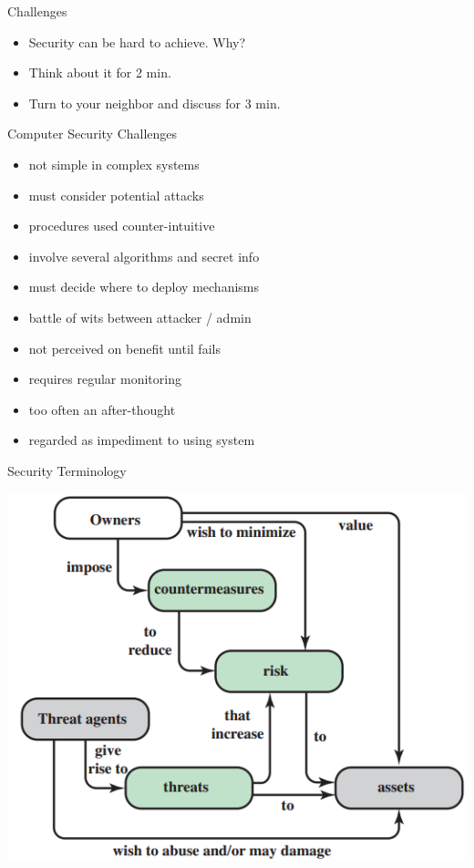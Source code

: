 \documentclass{beamer}
\begin{document}
\begin{frame}{Challenges}
  \begin{itemize}
  \item Security can be hard to achieve. Why? 
  \item Think about it for 2 min. 
  \item Turn to your neighbor and discuss for 3 min.
  \end{itemize}
\end{frame}
 
\begin{frame}{Computer Security Challenges}
  \begin{itemize}
\item not simple in complex systems 
\item must consider potential attacks 
\item procedures used counter-intuitive 
\item involve several algorithms and secret info 
\item must decide where to deploy mechanisms 
\item battle of wits between attacker / admin 
\item not perceived on benefit until fails 
\item requires regular monitoring 
\item too often an after-thought 
\item regarded as impediment to using system
  \end{itemize}
\end{frame}


\begin{frame}{Security Terminology}
  \begin{center}
    \includegraphics[width=0.7\linewidth]{terminology}
  \end{center}
\end{frame}
\end{document}

